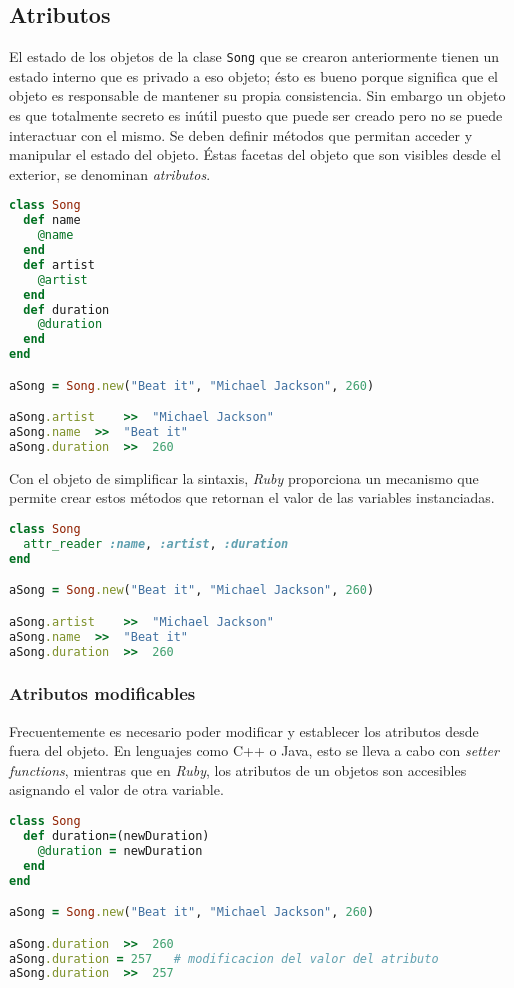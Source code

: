 \subsection{Atributos}
El estado de los objetos de la clase \texttt{Song} que se crearon anteriormente tienen un estado interno que es privado a eso objeto; ésto es bueno porque significa que el objeto es responsable de mantener su propia consistencia. 
Sin embargo un objeto es que totalmente secreto es inútil puesto que puede ser creado pero no se puede interactuar con el mismo. Se deben definir métodos que permitan acceder y manipular el estado del objeto. Éstas facetas del objeto que son visibles desde el exterior, se denominan \textit{atributos}.

\begin{lstlisting}[language=Ruby]
class Song
  def name
    @name
  end
  def artist
    @artist
  end
  def duration
    @duration
  end
end

aSong = Song.new("Beat it", "Michael Jackson", 260)

aSong.artist	>>	"Michael Jackson"
aSong.name	>>	"Beat it"
aSong.duration	>>	260
\end{lstlisting}

Con el objeto de simplificar la sintaxis, \textit{Ruby} proporciona un mecanismo que permite crear estos métodos que retornan el valor de las variables instanciadas.

\begin{lstlisting}[language=Ruby]
class Song
  attr_reader :name, :artist, :duration
end

aSong = Song.new("Beat it", "Michael Jackson", 260)

aSong.artist	>>	"Michael Jackson"
aSong.name	>>	"Beat it"
aSong.duration	>>	260
\end{lstlisting}

\subsubsection{Atributos modificables}
Frecuentemente es necesario poder modificar y establecer los atributos desde fuera del objeto. En lenguajes como C++ o Java, esto se lleva a cabo con \textit{setter functions}, mientras que en \textit{Ruby}, los atributos de un objetos son accesibles asignando el valor de otra variable.

\begin{lstlisting}[language=Ruby]
class Song
  def duration=(newDuration)
    @duration = newDuration
  end
end

aSong = Song.new("Beat it", "Michael Jackson", 260)

aSong.duration	>>	260
aSong.duration = 257   # modificacion del valor del atributo
aSong.duration  >>	257
\end{lstlisting}

